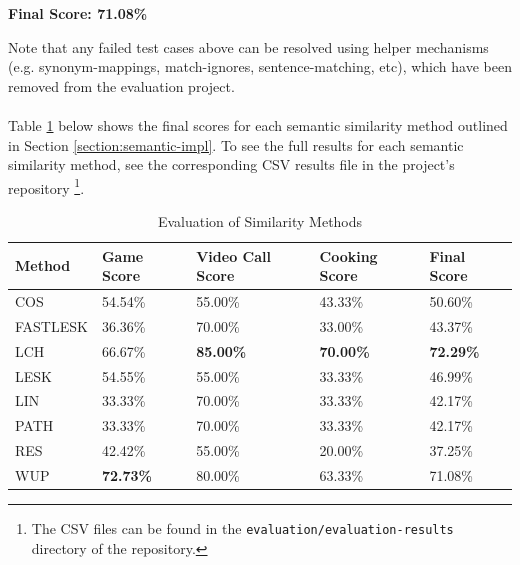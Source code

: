 \documentclass[11pt]{article}
\begin{document}
\begin{center}
\textbf{Final Score: 71.08\%}
\end{center}

Note that any failed test cases above can be resolved using helper mechanisms (e.g. synonym-mappings, match-ignores, sentence-matching, etc), which have been removed from the evaluation project.
\\
\\
Table \ref{table:method-results} below shows the final scores for each semantic similarity method outlined in Section \ref{section:semantic-impl}. To see the full results for each semantic similarity method, see the corresponding CSV results file in the project's repository \footnote{The CSV files can be found in the \texttt{evaluation/evaluation-results} directory of the repository.}.

\begin{table}[H]
\centering
\caption{Evaluation of Similarity Methods}
\label{table:method-results}
\begin{tabular}{l|l|l|l|l}
\textbf{Method} & \textbf{Game Score} & \textbf{Video Call Score} & \textbf{Cooking Score} & \textbf{Final Score} \\ \hline
COS             & 54.54\%             & 55.00\%                     & 43.33\%                & 50.60\%              \\ \hline
FASTLESK        & 36.36\%             & 70.00\%                     & 33.00\%                & 43.37\%              \\ \hline
LCH             & 66.67\%             & \textbf{85.00\%}            & \textbf{70.00\%}       & \textbf{72.29\%}     \\ \hline
LESK            & 54.55\%             & 55.00\%                     & 33.33\%                & 46.99\%              \\ \hline
LIN             & 33.33\%             & 70.00\%                     & 33.33\%                & 42.17\%              \\ \hline
PATH            & 33.33\%             & 70.00\%                     & 33.33\%                & 42.17\%              \\ \hline
RES             & 42.42\%             & 55.00\%                     & 20.00\%                & 37.25\%              \\ \hline
WUP             & \textbf{72.73\%}    & 80.00\%                     & 63.33\%                & 71.08\%               
\end{tabular}
\end{table}
\end{document}
